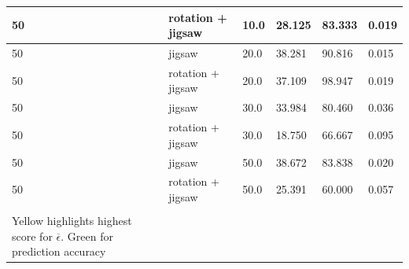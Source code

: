 \begin{longtable}{|| p{} | p{} | p{} | p{} | p{} | p{} ||}
    50                & rotation + jigsaw & 10.0           & 28.125                    & 83.333                 & 0.019   \\ \hline
    50                & jigsaw            & 20.0           & 38.281                    & 90.816                 & 0.015   \\ \hline
    50                & rotation + jigsaw & 20.0           & 37.109                    & 98.947                 & 0.019   \\ \hline
    50                & jigsaw            & 30.0           & 33.984                    & 80.460                 & 0.036   \\ \hline
    50                & rotation + jigsaw & 30.0           & 18.750                    & 66.667                 & 0.095   \\ \hline
    50                & jigsaw            & 50.0           & 38.672                    & 83.838                 & 0.020   \\ \hline
    50                & rotation + jigsaw & 50.0           & 25.391                    & 60.000                 & 0.057   \\ \hline
    \hline \hline
    \caption{
        \label{tab:table2}Results for EfficientNet.
        \\ Yellow highlights highest score for $\overline{\epsilon}$. Green for prediction accuracy
    }
\end{longtable}


